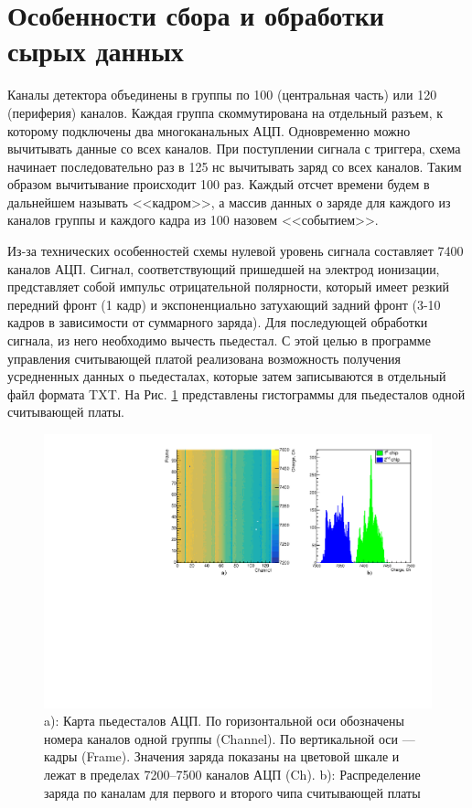 \section{Особенности сбора и обработки сырых данных}
\label{sec:DAQ_raw_data}
Каналы детектора объединены в группы по 100 (центральная часть) или 120 (периферия) каналов. Каждая группа скоммутирована на отдельный разъем, к которому подключены два многоканальных АЦП. Одновременно можно вычитывать данные со всех каналов. При поступлении сигнала с триггера, схема начинает последовательно раз в 125 нс вычитывать заряд со всех каналов. Таким образом вычитывание происходит 100 раз. Каждый отсчет времени будем в дальнейшем называть <<кадром>>, а массив данных о заряде для каждого из каналов группы и каждого кадра из 100 назовем <<событием>>. 
\par Из-за технических особенностей схемы нулевой уровень сигнала составляет 7400 каналов АЦП. Сигнал, соответствующий пришедшей на электрод ионизации, представляет собой импульс отрицательной полярности, который имеет резкий передний фронт (1 кадр) и экспоненциально затухающий задний фронт (3-10 кадров в зависимости от суммарного заряда). Для последующей обработки сигнала, из него необходимо вычесть пьедестал. С этой целью в программе управления считывающей платой реализована возможность получения усредненных данных о пьедесталах, которые затем записываются в отдельный файл формата TXT. На Рис. \ref{pedestal_map} представлены гистограммы для пьедесталов одной считывающей платы.
\begin{figure}[H]
\begin{center}
	\includegraphics[width = 12cm]{img/pedestal_map.pdf}
	\caption{a): Карта пьедесталов АЦП. По горизонтальной оси обозначены номера каналов одной группы (Channel). По вертикальной оси --- кадры (Frame). Значения заряда показаны на цветовой шкале и лежат в пределах 7200--7500 каналов АЦП (Ch). b): Распределение заряда по каналам для первого и второго чипа считывающей платы}
	\label{pedestal_map}
\end{center}
\end{figure}
